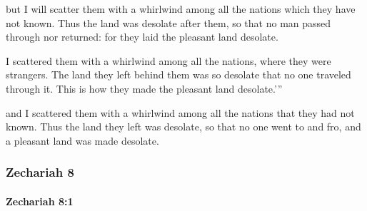 			\begin{versebox}
					\item[BHS] 
					\item[LXX] 
					\item[ASV] but I will scatter them with a whirlwind among all the nations which they have not known. Thus the land was desolate after them, so that no man passed through nor returned: for they laid the pleasant land desolate.
					\item[NIV] I scattered them with a whirlwind among all the nations, where they were strangers. The land they left behind them was so desolate that no one traveled through it. This is how they made the pleasant land desolate.’”
					\item[NRSV] and I scattered them with a whirlwind among all the nations that they had not known. Thus the land they left was desolate, so that no one went to and fro, and a pleasant land was made desolate.
			\end{versebox}
	\subsubsection{Zechariah 8} %
		\label{ZECHARIAH-8}

		\paragraph{Zechariah 8:1} %
			\label{ZECHARIAH-8-1}

